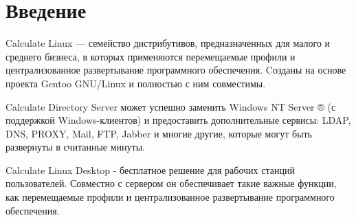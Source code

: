\newpage
\part{Введение}
Calculate Linux — семейство дистрибутивов, предназначенных для малого и среднего бизнеса, в которых применяются перемещаемые профили и централизованное развертывание программного обеспечения. Cозданы на основе проекта Gentoo GNU/Linux и полностью с ним совместимы.

Calculate Directory Server может успешно заменить Windows NT Server ® (с поддержкой Windows-клиентов) и предоставить дополнительные сервисы: LDAP, DNS, PROXY, Mail, FTP, Jabber и многие другие, которые могут быть развернуты в считанные минуты.

Calculate Linux Desktop - бесплатное решение для рабочих станций пользователей. Совместно с сервером он обеспечивает такие важные функции, как перемещаемые профили и централизованное развертывание программного обеспечения.